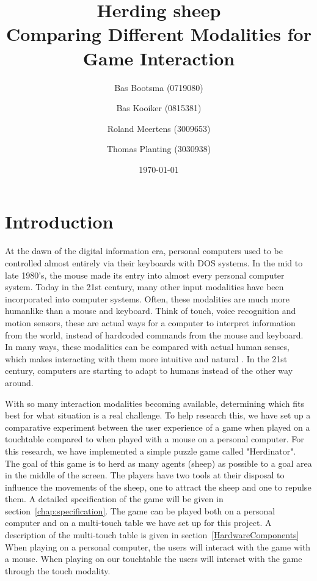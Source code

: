\documentclass[a4paper,10pt]{report}
\begin{document}
\title{Herding sheep \\
	\large Comparing Different Modalities for Game Interaction}
\author{Bas Bootsma (0719080) \and Bas Kooiker (0815381) \and Roland Meertens (3009653) \and Thomas Planting (3030938)}
\date{\today}
\maketitle
\tableofcontents

\chapter{Introduction}
\label{chap:introduction}

At the dawn of the digital information era, personal computers used to be controlled almost entirely via their keyboards with DOS systems. 
In the mid to late 1980's, the mouse made its entry into almost every personal computer system.
Today in the 21st century, many other input modalities have been incorporated into computer systems.
Often, these modalities are much more humanlike than a mouse and keyboard. 
Think of touch, voice recognition and motion sensors, these are actual ways for a computer to interpret information from the world, instead of hardcoded commands from the mouse and keyboard. 
In many ways, these modalities can be compared with actual human senses, which makes interacting with them more intuitive and natural \cite{earnshaw2001frontiers}.
In the 21st century, computers are starting to adapt to humans instead of the other way around.

With so many interaction modalities becoming available, determining which fits best for what situation is a real challenge.
To help research this, we have set up a comparative experiment between the user experience of a game when played on a touchtable compared to when played with a mouse on a personal computer.
For this research, we have implemented a simple puzzle game called "Herdinator". 
The goal of this game is to herd as many agents (sheep) as possible to a goal area in the middle of the screen.
The players have two tools at their disposal to influence the movements of the sheep, one to attract the sheep and one to repulse them.
A detailed specification of the game will be given in section~\ref{chap:specification}.
The game can be played both on a personal computer and on a multi-touch table we have set up for this project. A description of the multi-touch table is given in section~\ref{HardwareComponents}
When playing on a personal computer, the users will interact with the game with a mouse.
When playing on our touchtable the users will interact with the game through the touch modality.
\end{document}

